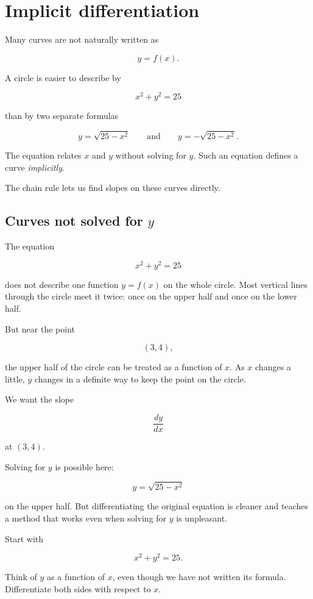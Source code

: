 \section{Implicit differentiation}
\label{sec:implicit-differentiation}

Many curves are not naturally written as

\[
y=f(x).
\]

A circle is easier to describe by

\[
x^2+y^2=25
\]

than by two separate formulas

\[
y=\sqrt{25-x^2}
\qquad\text{and}\qquad
y=-\sqrt{25-x^2}.
\]

The equation relates \(x\) and \(y\) without solving for \(y\).  Such an equation defines a curve \emph{implicitly}.

The chain rule lets us find slopes on these curves directly.

\subsection{Curves not solved for \(y\)}
\label{subsec:curves-not-solved-for-y}

The equation

\[
x^2+y^2=25
\]

does not describe one function \(y=f(x)\) on the whole circle.  Most vertical lines through the circle meet it twice: once on the upper half and once on the lower half.

But near the point

\[
(3,4),
\]

the upper half of the circle can be treated as a function of \(x\).  As \(x\) changes a little, \(y\) changes in a definite way to keep the point on the circle.

We want the slope

\[
\frac{dy}{dx}
\]

at \((3,4)\).

Solving for \(y\) is possible here:

\[
y=\sqrt{25-x^2}
\]

on the upper half.  But differentiating the original equation is cleaner and teaches a method that works even when solving for \(y\) is unpleasant.

Start with

\[
x^2+y^2=25.
\]

Think of \(y\) as a function of \(x\), even though we have not written its formula.  Differentiate both sides with respect to \(x\).

